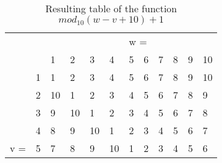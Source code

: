 \begin{table}[H]
\centering
\caption{Resulting table of the function $mod_{10}(w-v+10)+1$}
\label{tab:mod}
\begin{tabular}{llllllllllll}
    &                         &                         &                         &                         &                         & \multicolumn{2}{l}{w =}                           &                         &                         &                         &                         \\
    &                         & 1                       & 2                       & 3                       & 4                       & 5                       & 6                       & 7                       & 8                       & 9                       & 10                      \\ \cline{3-12} 
    & \multicolumn{1}{l|}{1}  & \multicolumn{1}{l|}{1}  & \multicolumn{1}{l|}{2}  & \multicolumn{1}{l|}{3}  & \multicolumn{1}{l|}{4}  & \multicolumn{1}{l|}{5}  & \multicolumn{1}{l|}{6}  & \multicolumn{1}{l|}{7}  & \multicolumn{1}{l|}{8}  & \multicolumn{1}{l|}{9}  & \multicolumn{1}{l|}{10} \\ \cline{3-12} 
    & \multicolumn{1}{l|}{2}  & \multicolumn{1}{l|}{10} & \multicolumn{1}{l|}{1}  & \multicolumn{1}{l|}{2}  & \multicolumn{1}{l|}{3}  & \multicolumn{1}{l|}{4}  & \multicolumn{1}{l|}{5}  & \multicolumn{1}{l|}{6}  & \multicolumn{1}{l|}{7}  & \multicolumn{1}{l|}{8}  & \multicolumn{1}{l|}{9}  \\ \cline{3-12} 
    & \multicolumn{1}{l|}{3}  & \multicolumn{1}{l|}{9}  & \multicolumn{1}{l|}{10} & \multicolumn{1}{l|}{1}  & \multicolumn{1}{l|}{2}  & \multicolumn{1}{l|}{3}  & \multicolumn{1}{l|}{4}  & \multicolumn{1}{l|}{5}  & \multicolumn{1}{l|}{6}  & \multicolumn{1}{l|}{7}  & \multicolumn{1}{l|}{8}  \\ \cline{3-12} 
    & \multicolumn{1}{l|}{4}  & \multicolumn{1}{l|}{8}  & \multicolumn{1}{l|}{9}  & \multicolumn{1}{l|}{10} & \multicolumn{1}{l|}{1}  & \multicolumn{1}{l|}{2}  & \multicolumn{1}{l|}{3}  & \multicolumn{1}{l|}{4}  & \multicolumn{1}{l|}{5}  & \multicolumn{1}{l|}{6}  & \multicolumn{1}{l|}{7}  \\ \cline{3-12} 
v = & \multicolumn{1}{l|}{5}  & \multicolumn{1}{l|}{7}  & \multicolumn{1}{l|}{8}  & \multicolumn{1}{l|}{9}  & \multicolumn{1}{l|}{10} & \multicolumn{1}{l|}{1}  & \multicolumn{1}{l|}{2}  & \multicolumn{1}{l|}{3}  & \multicolumn{1}{l|}{4}  & \multicolumn{1}{l|}{5}  & \multicolumn{1}{l|}{6}  \\ \cline{3-12} 

\end{tabular}
\end{table}
